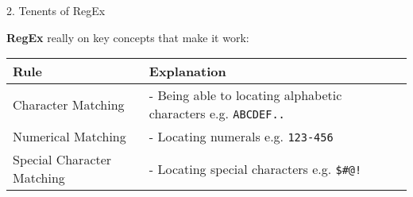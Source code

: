 \documentclass[ignorenonframetext,]{beamer}
\begin{document}
\begin{frame}[fragile]{2. Tenents of RegEx}
\protect\hypertarget{tenents-of-regex}{}

\textbf{RegEx} really on key concepts that make it work:

\begin{longtable}[]{@{}ll@{}}
\toprule
\begin{minipage}[b]{0.28\columnwidth}\raggedright
Rule\strut
\end{minipage} & \begin{minipage}[b]{0.66\columnwidth}\raggedright
Explanation\strut
\end{minipage}\tabularnewline
\midrule
\endhead
\begin{minipage}[t]{0.28\columnwidth}\raggedright
Character Matching\strut
\end{minipage} & \begin{minipage}[t]{0.66\columnwidth}\raggedright
- Being able to locating alphabetic characters e.g.
\texttt{ABCDEF..}\strut
\end{minipage}\tabularnewline
\begin{minipage}[t]{0.28\columnwidth}\raggedright
Numerical Matching\strut
\end{minipage} & \begin{minipage}[t]{0.66\columnwidth}\raggedright
- Locating numerals e.g. \texttt{123-456}\strut
\end{minipage}\tabularnewline
\begin{minipage}[t]{0.28\columnwidth}\raggedright
Special Character Matching\strut
\end{minipage} & \begin{minipage}[t]{0.66\columnwidth}\raggedright
- Locating special characters e.g. \texttt{\$\#@!}\strut
\end{minipage}\tabularnewline
\bottomrule
\end{longtable}

\end{frame}
\end{document}
